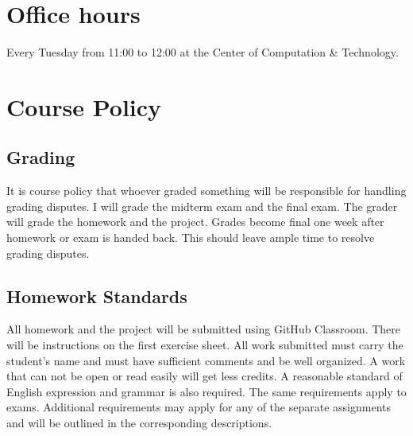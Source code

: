 \documentclass[11pt,letterpaper]{article}
\begin{document}
\section*{Office hours}
Every Tuesday from 11:00 to 12:00 at the Center of Computation \& Technology. 

\section*{Course Policy}

\subsection*{Grading}
It is course policy that whoever graded something will be responsible for handling grading disputes. I will grade the midterm exam and the final exam. The grader will grade the homework and the project. Grades become final one week after homework or exam is handed back. This should leave ample time to resolve grading disputes.

\subsection*{Homework Standards}
All homework and the project will be submitted using GitHub Classroom. There will be instructions on the first exercise sheet. All work submitted must carry the student's name and must have sufficient comments and be well organized. A work that can not be open or read easily will get less credits.  A  reasonable standard  of  English  expression  and  grammar  is  also  required.  The  same  requirements  apply  to  exams. Additional requirements   may   apply   for   any   of   the   separate   assignments   and   will   be   outlined   in   the   corresponding descriptions.
 
\end{document}
